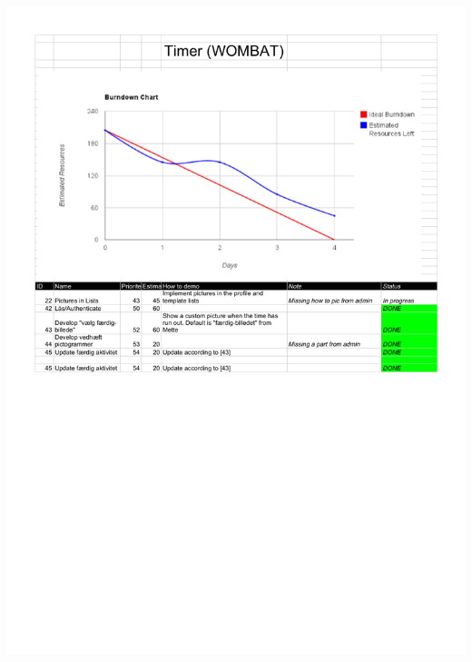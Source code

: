 \begin{center}
		\includegraphics[width=\textwidth]{Development/burndown_charts/Sprint_6.pdf}
	\end{center}
	
	
